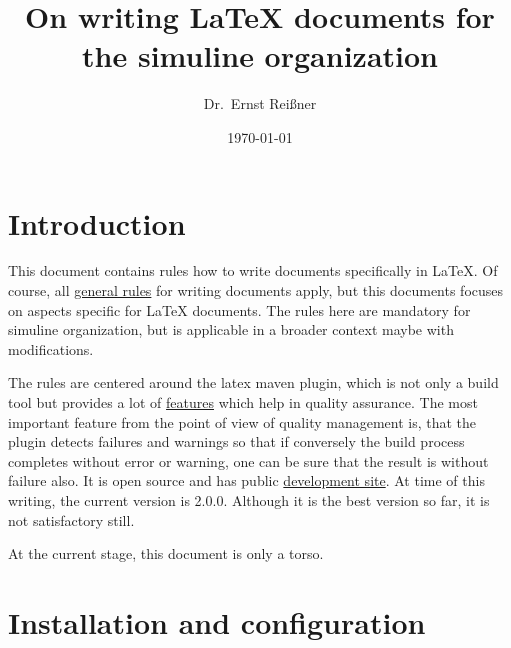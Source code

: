 \documentclass[a4paper,12pt,english]{article}
\title{On writing \LaTeX{} documents for the simuline organization}
\author{Dr.~Ernst Reißner}
\date{\today}
\newcommand{\siteref}[2]{\href{http://www.simuline.eu/QualityManagement/#1}{#2}}
\begin{document}
\maketitle


\newpage

\tableofcontents %
\lstlistoflistings%
\newpage 

\section{Introduction}

This document contains rules how to write documents specifically in \LaTeX. 
Of course, all \siteref{WritingRules/writingRules.html}{general rules} 
for writing documents apply, 
but this documents focuses on aspects specific for \LaTeX{} documents. 
The rules here are mandatory for simuline organization, 
but is applicable in a broader context maybe with modifications. 

The rules are centered around the latex maven plugin, 
which is not only a build tool 
but provides a lot of \href{http://www.simuline.eu/LatexMavenPlugin/features.html}{features} 
which help in quality assurance. 
The most important feature from the point of view of quality management is, 
that the plugin detects failures and warnings so 
that if conversely the build process completes without error or warning, 
one can be sure that the result is without failure also. 
It is open source and has public \href{https://github.com/Reissner/latex-maven-plugin}{development site}. 
At time of this writing, the current version is 2.0.0. 
Although it is the best version so far, 
it is not satisfactory still. 


At the current stage, this document is only a torso. 


\section{Installation and configuration}\label{sec:instConfig}
\end{document}
